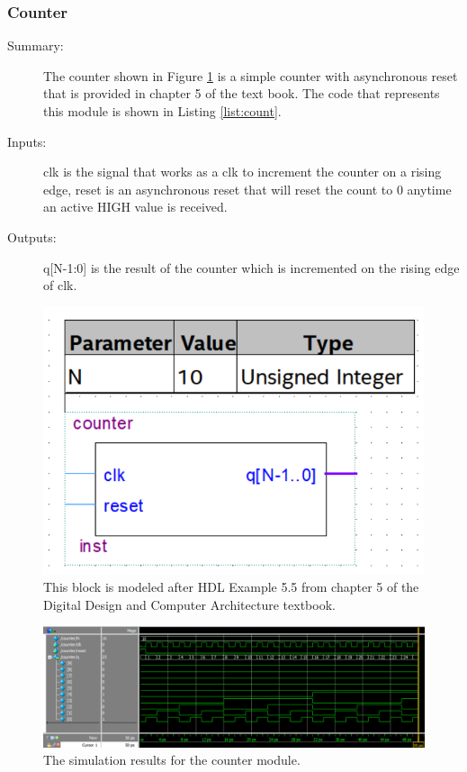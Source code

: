 \documentclass[a4paper]{article}
\begin{document}
\subsubsection{Counter}
\begin{description}
    \item[Summary: ] The counter shown in Figure \ref{fig:count} is a simple counter with asynchronous reset that is provided in chapter 5 of the text book. The code that represents this module is shown in Listing \ref{list:count}.
    \item[Inputs: ] clk is the signal that works as a clk to increment the counter on a rising edge, reset is an asynchronous reset that will reset the count to 0 anytime an active HIGH value is received.
    \item[Outputs: ] q[N-1:0] is the result of the counter which is incremented on the rising edge of clk.
\end{description}

\begin{figure}[H]
    \centering
    \includegraphics[width=.5\textwidth]{Images/counter.png}
    \caption{This block is modeled after HDL Example 5.5 from chapter 5 of the Digital Design and Computer Architecture textbook.}
    \label{fig:count}
\end{figure}

\begin{figure}[H]
    \centering
    \includegraphics[width=5.91in]{Images/counterSim.png}
    \caption{The simulation results for the counter module.}
    \label{fig:count_sim}
\end{figure}
\end{document}
